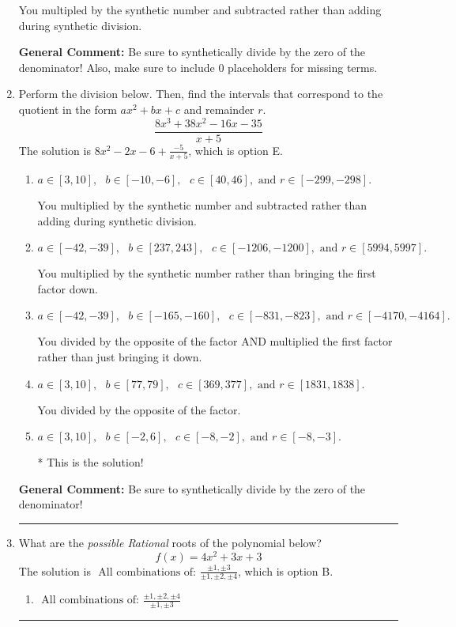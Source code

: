 \documentclass{extbook}[14pt]
\newcommand{\litem}[1]{\item #1

\rule{\textwidth}{0.4pt}}
\begin{document}
\begin{enumerate}
{\begin{enumerate}[label=\Alph*.]
 You multipled by the synthetic number and subtracted rather than adding during synthetic division.
\end{enumerate}

\textbf{General Comment:} Be sure to synthetically divide by the zero of the denominator! Also, make sure to include 0 placeholders for missing terms.
}
\litem{
Perform the division below. Then, find the intervals that correspond to the quotient in the form $ax^2+bx+c$ and remainder $r$.
\[ \frac{8x^{3} +38 x^{2} -16 x -35}{x + 5} \]The solution is \( 8x^{2} -2 x -6 + \frac{-5}{x + 5} \), which is option E.\begin{enumerate}[label=\Alph*.]
\item \( a \in [3, 10], \text{   } b \in [-10, -6], \text{   } c \in [40, 46], \text{   and   } r \in [-299, -298]. \)

 You multiplied by the synthetic number and subtracted rather than adding during synthetic division.
\item \( a \in [-42, -39], \text{   } b \in [237, 243], \text{   } c \in [-1206, -1200], \text{   and   } r \in [5994, 5997]. \)

 You multiplied by the synthetic number rather than bringing the first factor down.
\item \( a \in [-42, -39], \text{   } b \in [-165, -160], \text{   } c \in [-831, -823], \text{   and   } r \in [-4170, -4164]. \)

 You divided by the opposite of the factor AND multiplied the first factor rather than just bringing it down.
\item \( a \in [3, 10], \text{   } b \in [77, 79], \text{   } c \in [369, 377], \text{   and   } r \in [1831, 1838]. \)

 You divided by the opposite of the factor.
\item \( a \in [3, 10], \text{   } b \in [-2, 6], \text{   } c \in [-8, -2], \text{   and   } r \in [-8, -3]. \)

* This is the solution!
\end{enumerate}

\textbf{General Comment:} Be sure to synthetically divide by the zero of the denominator!
}
\litem{
What are the \textit{possible Rational} roots of the polynomial below?
\[ f(x) = 4x^{2} +3 x + 3 \]The solution is \( \text{ All combinations of: }\frac{\pm 1,\pm 3}{\pm 1,\pm 2,\pm 4} \), which is option B.\begin{enumerate}[label=\Alph*.]
\item \( \text{ All combinations of: }\frac{\pm 1,\pm 2,\pm 4}{\pm 1,\pm 3} \)


\end{enumerate}}
\end{enumerate}
\end{document}
